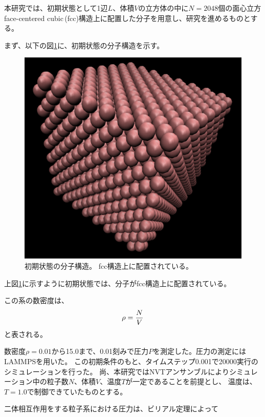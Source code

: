 \documentclass[titlepage]{jsreport}
\begin{document}
{{{本研究では、初期状態として1辺$L$、体積$V$の立方体の中に$N=2048$個の面心立方face-centered cubic\,(fcc)構造上に配置した分子を用意し、研究を進めるものとする。

\newpage
まず、以下の図\ref{fig:initial-state-molecule}に、初期状態の分子構造を示す。

\begin{figure}[htbp]
    \begin{center}
        \includegraphics[width=12cm]{fig/initial-state-molecule.png}
    \end{center}
    \caption{初期状態の分子構造。
    fcc構造上に配置されている。}
    \label{fig:initial-state-molecule}
\end{figure}

上図\ref{fig:initial-state-molecule}に示すように初期状態では、分子がfcc構造上に配置されている。

この系の数密度は、
\large
\begin{equation}
\rho = {\frac{N}{V}}{\label{eq:density}}
\end{equation}
\normalsize
と表される。

数密度$\rho=0.01$から15.0まで、0.01刻みで圧力$P$を測定した。圧力の測定にはLAMMPSを用いた。
この初期条件のもと、タイムステップ0.001で20000実行のシミュレーションを行った。
尚、本研究ではNVTアンサンブルによりシミュレーション中の粒子数$N$、体積$V$、温度$T$が一定であることを前提とし、
温度は、$T=1.0$で制御できていたものとする。

二体相互作用をする粒子系における圧力は、ビリアル定理によって

}}}
\end{document}
